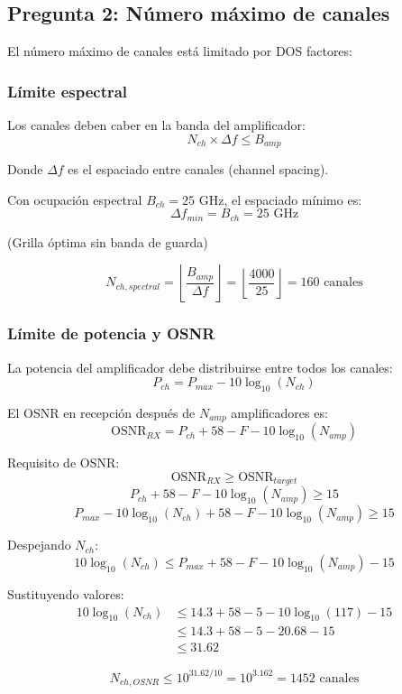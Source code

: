 \documentclass[a4paper,10pt]{article}
\begin{document}
\subsection{Pregunta 2: Número máximo de canales}

El número máximo de canales está limitado por DOS factores:

\subsubsection{Límite espectral}

Los canales deben caber en la banda del amplificador:
$$N_{ch} \times \Delta f \leq B_{amp}$$

Donde $\Delta f$ es el espaciado entre canales (channel spacing).

Con ocupación espectral $B_{ch} = 25$ GHz, el espaciado mínimo es:
$$\Delta f_{min} = B_{ch} = 25 \text{ GHz}$$

(Grilla óptima sin banda de guarda)

$$N_{ch,spectral} = \left\lfloor \frac{B_{amp}}{\Delta f} \right\rfloor = \left\lfloor \frac{4000}{25} \right\rfloor = \boxed{160 \text{ canales}}$$

\subsubsection{Límite de potencia y OSNR}

La potencia del amplificador debe distribuirse entre todos los canales:
$$P_{ch} = P_{max} - 10\log_{10}(N_{ch})$$

El OSNR en recepción después de $N_{amp}$ amplificadores es:
$$\text{OSNR}_{RX} = P_{ch} + 58 - F - 10\log_{10}(N_{amp})$$

Requisito de OSNR:
$$\text{OSNR}_{RX} \geq \text{OSNR}_{target}$$
$$P_{ch} + 58 - F - 10\log_{10}(N_{amp}) \geq 15$$
$$P_{max} - 10\log_{10}(N_{ch}) + 58 - F - 10\log_{10}(N_{amp}) \geq 15$$

Despejando $N_{ch}$:
$$10\log_{10}(N_{ch}) \leq P_{max} + 58 - F - 10\log_{10}(N_{amp}) - 15$$

Sustituyendo valores:
\begin{align*}
10\log_{10}(N_{ch}) &\leq 14.3 + 58 - 5 - 10\log_{10}(117) - 15\\
&\leq 14.3 + 58 - 5 - 20.68 - 15\\
&\leq 31.62
\end{align*}

$$N_{ch,OSNR} \leq 10^{31.62/10} = 10^{3.162} = \boxed{1452 \text{ canales}}$$
\end{document}
